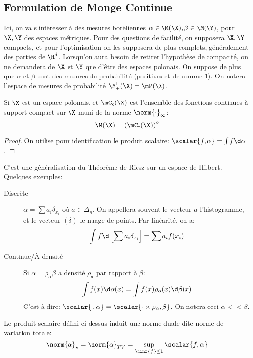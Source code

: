 \documentclass[info, math, french]{mpb-cours}
\begin{document}
\subsection{Formulation de Monge Continue}
Ici, on va s'intéresser à des mesures boréliennes $\alpha \in \M(\X), \beta \in \M(\Y)$,
pour $\X, \Y$ des espaces métriques.
Pour des questions de facilité, on supposera $\X, \Y$ compacts, et pour l'optimisation on les supposera
de plus complets, généralement des parties de $\R^{d}$.
Lorsqu'on aura besoin de retirer l'hypothèse de compacité, on ne demandera de $\X$ et $\Y$
que d'être des espaces polonais.
On suppose de plus que $\alpha$ et $\beta$ sont des mesures de probabilité (positives et de somme $1$).
On notera l'espace de mesures de probabilité $\M_{+}^{1}(\X) = \mP(\X)$.
\begin{thm}
	Si $\X$ est un espace polonais, et $\mC_{c}(\X)$ est l'ensemble des fonctions continues à support compact sur $\X$ muni de la norme $\norm{\cdot}_{\infty}$:
	\begin{equation*}
		\M(\X) = \left(\mC_{c}(\X)\right)^{\circ}
	\end{equation*}
\end{thm}
\begin{proof}
	On utilise pour identification le produit scalaire: $\scalar{f, \alpha} = \int f \d\alpha$.
\end{proof}
C'est une généralisation du Théorème de Riesz sur un espace de Hilbert.
Quelques exemples:
\begin{description}
	\item[Discrète] $\alpha = \sum a_{i}\delta_{x_{i}}$ où $a \in \Delta_{n}$.
	      On appellera souvent le vecteur $a$ l'histogramme, et le vecteur $(\delta)$ le nuage de points.
	      Par linéarité, on a:
	      \begin{equation*}
		      \int f\d\left[\sum a_{i}\delta_{x_{i}}\right] = \sum a_{i}f(x_{i})
	      \end{equation*}
	\item[Continue/À densité] Si $\alpha = \rho_{\alpha}\beta$ a densité $\rho_{\alpha}$ par rapport à $\beta$:
	      \begin{equation*}
		      \int f(x)\d\alpha(x) = \int f(x) \rho_{\alpha}(x)\d\beta(x)
	      \end{equation*}
	      C'est-à-dire: $\scalar{\cdot, \alpha} = \scalar{\cdot \times \rho_{\alpha}, \beta}$. On notera ceci $\alpha << \beta$.
\end{description}

Le produit scalaire défini ci-dessus induit une norme duale dite norme de variation totale:
\begin{equation*}
	\norm{\alpha}_{\star} = \norm{\alpha}_{TV} = \sup_{\ninf{f} \leq 1}\scalar{f, \alpha}
\end{equation*}
\end{document}
